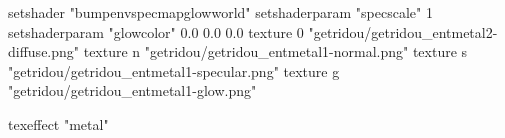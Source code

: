 setshader "bumpenvspecmapglowworld"
setshaderparam "specscale" 1
setshaderparam "glowcolor" 0.0 0.0 0.0
texture 0 "getridou/getridou_entmetal2-diffuse.png"
texture n "getridou/getridou_entmetal1-normal.png"
texture s "getridou/getridou_entmetal1-specular.png"
texture g "getridou/getridou_entmetal1-glow.png"

texeffect "metal"
